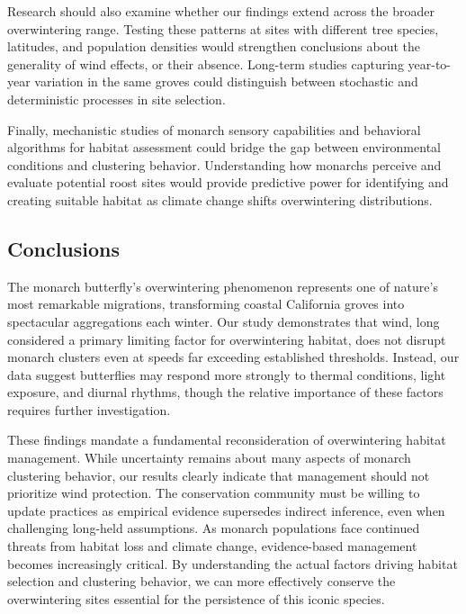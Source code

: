 Research should also examine whether our findings extend across the broader overwintering range. Testing these patterns at sites with different tree species, latitudes, and population densities would strengthen conclusions about the generality of wind effects, or their absence. Long-term studies capturing year-to-year variation in the same groves could distinguish between stochastic and deterministic processes in site selection.

Finally, mechanistic studies of monarch sensory capabilities and behavioral algorithms for habitat assessment could bridge the gap between environmental conditions and clustering behavior. Understanding how monarchs perceive and evaluate potential roost sites would provide predictive power for identifying and creating suitable habitat as climate change shifts overwintering distributions.

\subsection{Conclusions}

The monarch butterfly's overwintering phenomenon represents one of nature's most remarkable migrations, transforming coastal California groves into spectacular aggregations each winter. Our study demonstrates that wind, long considered a primary limiting factor for overwintering habitat, does not disrupt monarch clusters even at speeds far exceeding established thresholds. Instead, our data suggest butterflies may respond more strongly to thermal conditions, light exposure, and diurnal rhythms, though the relative importance of these factors requires further investigation.

These findings mandate a fundamental reconsideration of overwintering habitat management. While uncertainty remains about many aspects of monarch clustering behavior, our results clearly indicate that management should not prioritize wind protection. The conservation community must be willing to update practices as empirical evidence supersedes indirect inference, even when challenging long-held assumptions. As monarch populations face continued threats from habitat loss and climate change, evidence-based management becomes increasingly critical. By understanding the actual factors driving habitat selection and clustering behavior, we can more effectively conserve the overwintering sites essential for the persistence of this iconic species.